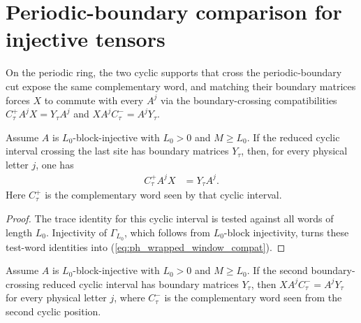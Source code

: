 \section{Periodic-boundary comparison for injective tensors}\label{sec:injective_boundary_closing}

On the periodic ring, the two cyclic supports that cross the periodic-boundary
cut expose the same complementary word, and matching their boundary matrices
forces $X$ to commute with every $A^j$ via the boundary-crossing
compatibilities $C^+_\tau A^j X=Y_\tau A^j$ and $X A^j C^-_\tau=A^jY_\tau$.

\begin{lemma}%
    \label{lem:wrapped_window_one_sided_compatibility}
    \leanok
    Assume $A$ is $L_0$-block-injective with $L_0>0$ and $M\ge L_0$.
    If the reduced cyclic interval crossing the last site has boundary matrices
    $Y_\tau$, then, for every physical letter $j$, one has
    \begin{align}
        C^+_\tau A^j X & = Y_\tau A^j.
        \label{eq:ph_wrapped_window_compat}
    \end{align}
    Here $C^+_\tau$ is the complementary word seen by that cyclic interval.
\end{lemma}

\begin{proof}
    \leanok
    The trace identity for this cyclic interval is tested against all words of
    length $L_0$. Injectivity of $\Gamma_{L_0}$, which follows from
    $L_0$-block injectivity, turns these test-word identities into
    (\ref{eq:ph_wrapped_window_compat}).
\end{proof}

\begin{lemma}%
    \label{lem:mirror_wrapped_window_one_sided_compatibility}
    \leanok
    Assume $A$ is $L_0$-block-injective with $L_0>0$ and $M\ge L_0$.
    If the second boundary-crossing reduced cyclic interval has boundary
    matrices $Y_\tau$, then $X A^j C^-_\tau=A^jY_\tau$ for every physical
    letter $j$, where $C^-_\tau$ is the complementary word seen from the second
    cyclic position.
\end{lemma}

